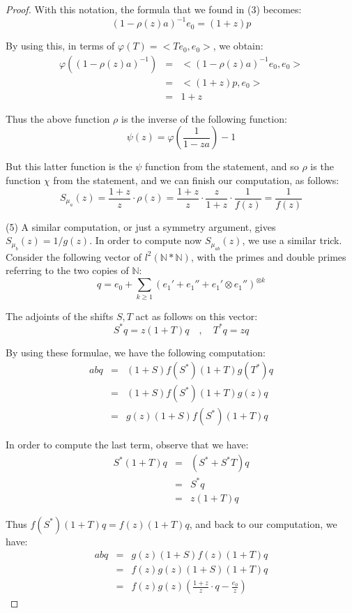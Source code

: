 \documentclass[12pt]{amsbook}
\begin{document}
\begin{proof}
With this notation, the formula that we found in (3) becomes:
$$(1-\rho(z)a)^{-1}e_0=(1+z)p$$

By using this, in terms of $\varphi(T)=<Te_0,e_0>$, we obtain:
\begin{eqnarray*}
\varphi\left((1-\rho(z)a)^{-1}\right)
&=&<(1-\rho(z)a)^{-1}e_0,e_0>\\
&=&<(1+z)p,e_0>\\
&=&1+z
\end{eqnarray*}

Thus the above function $\rho$ is the inverse of the following function:
$$\psi(z)=\varphi\left(\frac{1}{1-za}\right)-1$$

But this latter function is the $\psi$ function from the statement, and so $\rho$ is the function $\chi$ from the statement, and we can finish our computation, as follows:
$$S_{\mu_a}(z)
=\frac{1+z}{z}\cdot\rho(z)
=\frac{1+z}{z}\cdot\frac{z}{1+z}\cdot\frac{1}{f(z)}
=\frac{1}{f(z)}$$

(5) A similar computation, or just a symmetry argument, gives $S_{\mu_b}(z)=1/g(z)$. In order to compute now $S_{\mu_{ab}}(z)$, we use a similar trick. Consider the following vector of $l^2(\mathbb N*\mathbb N)$, with the primes and double primes referring to the two copies of $\mathbb N$:
$$q=e_0+\sum_{k\geq1}(e_1'+e_1''+e_1'\otimes e_1'')^{\otimes k}$$

The adjoints of the shifts $S,T$ act as follows on this vector:
$$S^*q=z(1+T)q\quad,\quad T^*q=zq$$

By using these formulae, we have the following computation:
\begin{eqnarray*}
abq
&=&(1+S)f(S^*)(1+T)g(T^*)q\\
&=&(1+S)f(S^*)(1+T)g(z)q\\
&=&g(z)(1+S)f(S^*)(1+T)q
\end{eqnarray*}

In order to compute the last term, observe that we have:
\begin{eqnarray*}
S^*(1+T)q
&=&(S^*+S^*T)q\\
&=&S^*q\\
&=&z(1+T)q
\end{eqnarray*}

Thus $f(S^*)(1+T)q=f(z)(1+T)q$, and back to our computation, we have:
\begin{eqnarray*}
abq
&=&g(z)(1+S)f(z)(1+T)q\\
&=&f(z)g(z)(1+S)(1+T)q\\
&=&f(z)g(z)\left(\frac{1+z}{z}\cdot q-\frac{e_0}{z}\right)
\end{eqnarray*}


\end{proof}
\end{document}
